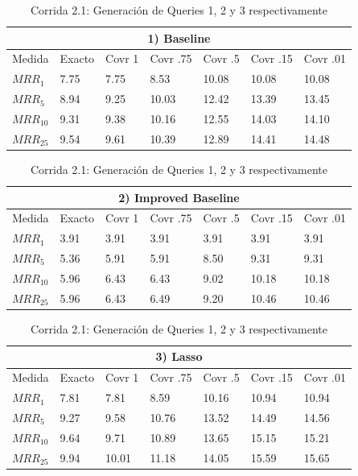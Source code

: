 \begin{table}[H]
\centering
\begin{center}
\begin{tabular}{|l | l | l | l | l | l | l |}
\hline
\multicolumn{7}{|c|}{1) Baseline}  \\ \hline
Medida & Exacto & Covr 1 & Covr .75 & Covr .5 & Covr .15 & Covr .01 \\ \hline

$MRR_{1}$ & 7.75 & 7.75 & 8.53 & 10.08 & 10.08 & 10.08  \\ \hline
$MRR_{5}$ & 8.94 & 9.25 & 10.03 & 12.42 & 13.39 & 13.45  \\ \hline
$MRR_{10}$ & 9.31 & 9.38 & 10.16 & 12.55 & 14.03 & 14.10  \\ \hline
$MRR_{25}$ & 9.54 & 9.61 & 10.39 & 12.89 & 14.41 & 14.48  \\ \hline
\end{tabular}

\medskip


\begin{tabular}{|l | l | l | l | l | l | l |}
\hline
\multicolumn{7}{|c|}{2) Improved Baseline}  \\ \hline
Medida & Exacto & Covr 1 & Covr .75 & Covr .5 & Covr .15 & Covr .01 \\ \hline

$MRR_{1}$ & 3.91 & 3.91 & 3.91 & 3.91 & 3.91 & 3.91  \\ \hline
$MRR_{5}$ & 5.36 & 5.91 & 5.91 & 8.50 & 9.31 & 9.31  \\ \hline
$MRR_{10}$ & 5.96 & 6.43 & 6.43 & 9.02 & 10.18 & 10.18  \\ \hline
$MRR_{25}$ & 5.96 & 6.43 & 6.49 & 9.20 & 10.46 & 10.46  \\ \hline
\end{tabular}


\medskip

\begin{tabular}{|l | l | l | l | l | l | l |}
\hline
\multicolumn{7}{|c|}{3) Lasso}  \\ \hline
Medida & Exacto & Covr 1 & Covr .75 & Covr .5 & Covr .15 & Covr .01 \\ \hline

$MRR_{1}$ & 7.81 & 7.81 & 8.59 & 10.16 & 10.94 & 10.94  \\ \hline
$MRR_{5}$ & 9.27 & 9.58 & 10.76 & 13.52 & 14.49 & 14.56  \\ \hline
$MRR_{10}$ & 9.64 & 9.71 & 10.89 & 13.65 & 15.15 & 15.21  \\ \hline
$MRR_{25}$ & 9.94 & 10.01 & 11.18 & 14.05 & 15.59 & 15.65  \\ \hline
\end{tabular}

\caption{Corrida 2.1: Generación de Queries 1, 2 y 3 respectivamente}
\label{table:2_1_50_40_getExactMRRWikiFactoid_getCovrMRRWikiFactoidx}
\end{center}
\end{table}


